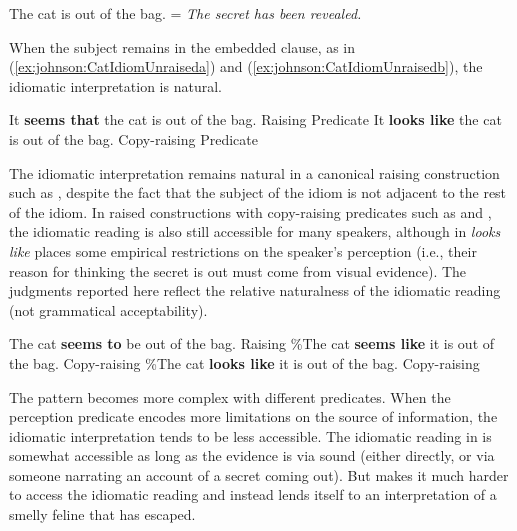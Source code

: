 \documentclass[output=paper,colorlinks,citecolor=brown
]{langscibook}
\begin{document}
\ea \label{ex:johnson:CatIdiom}
The cat is out of the bag. = \textit{The secret has been revealed.}
\z 

\noindent When the subject remains in the embedded clause, as in (\ref{ex:johnson:CatIdiomUnraiseda}) and (\ref{ex:johnson:CatIdiomUnraisedb}), the idiomatic interpretation is natural. 

\ea \label{ex:johnson:CatIdiomUnraised}
\begin{xlist}

\ex\label{ex:johnson:CatIdiomUnraiseda} It \textbf{seems that} the cat is out of the bag.  \hfill {Raising Predicate}
\ex\label{ex:johnson:CatIdiomUnraisedb} It \textbf{looks like} the cat is out of the bag. \hfill {Copy-raising Predicate}

\end{xlist}
\z 

\noindent The idiomatic interpretation remains natural in a canonical raising construction such as ,  despite the fact that the subject of the idiom is not adjacent to the rest of the idiom. In raised constructions with copy-raising predicates such as  and , the idiomatic reading is also still accessible for many speakers, although in  \textit{looks like} places some empirical restrictions on the speaker's perception (i.e., their reason for thinking the secret is out must come from visual evidence). The judgments reported here reflect the relative naturalness of the idiomatic reading (not grammatical acceptability).

\ea \label{ex:johnson:CatIdiomRaisedConstructions}
\begin{xlist}

\ex \label{ex:johnson:CatIdiomRaising} The cat \textbf{seems to} be out of the bag.  \hfill {Raising}
\ex \label{ex:johnson:CatIdiomSeemsLike} \%The cat \textbf{seems like} it is out of the bag. \hfill {Copy-raising}
\ex \label{ex:johnson:CatIdiomLooksLike} \%The cat \textbf{looks like} it is out of the bag. \hfill {Copy-raising}

\end{xlist}
\z 

\noindent The pattern becomes more complex with different predicates. When the perception predicate encodes more limitations on the source of information, the idiomatic interpretation tends to be less accessible. The idiomatic reading in  is somewhat accessible as long as the evidence is via sound (either directly, or via someone narrating an account of a secret coming out). But  makes it much harder to access the idiomatic reading and instead lends itself to an interpretation of a smelly feline that has escaped.
\end{document}
